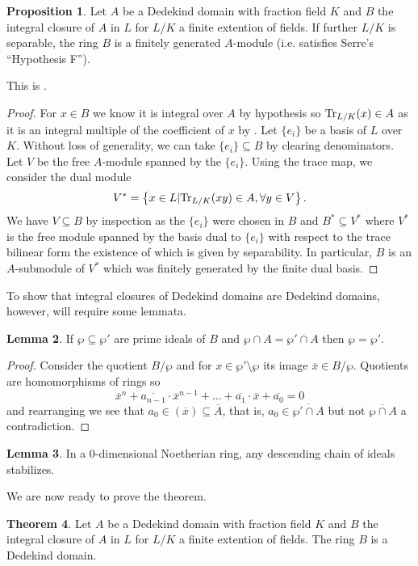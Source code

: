 \documentclass{amsart}
\theoremstyle{definition}
\newtheorem{theorem}{Theorem}[section]
\newtheorem{lemma}[theorem]{Lemma}
\newtheorem{proposition}[theorem]{Proposition}
\numberwithin{equation}{section}
\begin{document}
\begin{proposition}
  Let $A$ be a Dedekind domain with fraction field $K$ and $B$ the integral closure of $A$ in $L$ for $L/K$ a finite extention of fields. If further $L/K$ is separable, the ring $B$ is a finitely generated $A$-module (i.e. satisfies Serre's ``Hypothesis F''). 
\end{proposition}
This is \cite[Ch. 1, \S 4, Prop. 8]{Serre}. 
\begin{proof}
  For $x\in B$ we know it is integral over $A$ by hypothesis so $\mathrm{Tr}_{L/K}(x)\in A$ as it is an integral multiple of the coefficient of $x$ by \cite[\href{https://stacks.math.columbia.edu/tag/0BIH}{0BIH}]{stacks-project}. Let $\{e_{i}\}$ be a basis of $L$ over $K$. Without loss of generality, we can take $\{e_{i}\}\subseteq B$ by clearing denominators. Let $V$ be the free $A$-module spanned by the $\{e_{i}\}$. Using the trace map, we consider the dual module 
  $$V^{*}=\left\{x\in L|\mathrm{Tr}_{L/K}(xy)\in A, \forall y\in V\right\}.$$
  We have $V\subseteq B$ by inspection as the $\{e_{i}\}$ were chosen in $B$ and $B^{*}\subseteq V^{*}$ where $V^{*}$ is the free module spanned by the basis dual to $\{e_{i}\}$ with respect to the trace bilinear form the existence of which is given by separability. In particular, $B$ is an $A$-submodule of $V^{*}$ which was finitely generated by the finite dual basis. 
\end{proof}
To show that integral closures of Dedekind domains are Dedekind domains, however, will require some lemmata. 
\begin{lemma}\label{lem: equality of primes in B}
  If $\wp\subseteq\wp'$ are prime ideals of $B$ and $\wp\cap A=\wp'\cap A$ then $\wp=\wp'$. 
\end{lemma}
\begin{proof}
  Consider the quotient $B/\wp$ and for $x\in\wp'\setminus\wp$ its image $\overline{x}\in B/\wp$. Quotients are homomorphisms of rings so
  $$\overline{x}^{n}+\overline{a_{n-1}}\cdot\overline{x}^{n-1}+\dots+\overline{a_{1}}\cdot\overline{x}+\overline{a_{0}}=0$$
  and rearranging we see that $a_{0}\in(\overline{x})\subseteq\overline{A}$, that is, $a_{0}\in\overline{\wp'\cap A}$ but not $\overline{\wp\cap A}$ a contradiction. 
\end{proof}
\begin{lemma}\label{lem:descending chain stabilizes}
  In a 0-dimensional Noetherian ring, any descending chain of ideals stabilizes. 
\end{lemma}
We are now ready to prove the theorem. 
\begin{theorem}
  Let $A$ be a Dedekind domain with fraction field $K$ and $B$ the integral closure of $A$ in $L$ for $L/K$ a finite extention of fields. The ring $B$ is a Dedekind domain. 
\end{theorem}
\newpage
\printbibliography
\end{document}
